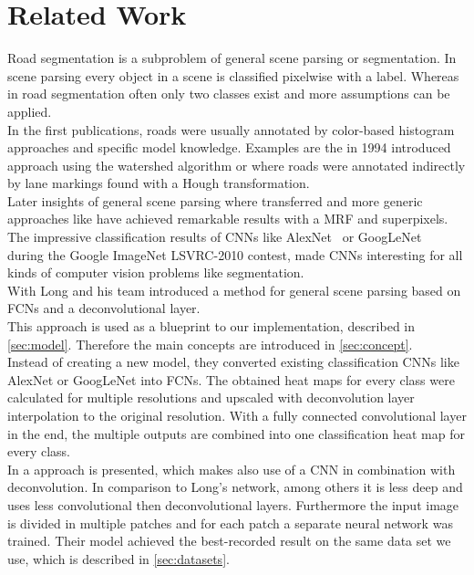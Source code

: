 
\section{Related Work}\label{sec:related-work}
Road segmentation is a subproblem of general scene parsing or segmentation. In
scene parsing every object in a scene is classified pixelwise with a label.
Whereas in road segmentation often only two classes exist and more assumptions
can be applied.\\
In the first publications, roads were usually annotated by color-based
histogram approaches and specific model knowledge. Examples are the in 1994
introduced approach \cite{Beucher1990} using the watershed algorithm or
\cite{aly2008real} where roads were annotated indirectly by lane markings found
with a Hough transformation.\\
Later insights of general scene parsing where transferred and more generic
approaches like \cite{6182716} have achieved remarkable results with a
\gls{MRF} and superpixels.\\ The impressive classification results of
\glspl{CNN} like AlexNet~\cite{krizhevsky2012imagenet} or
GoogLeNet~\cite{SzegedyLJSRAEVR14} during the Google ImageNet LSVRC-2010
contest, made \glspl{CNN} interesting for all kinds of computer vision problems
like segmentation.\\
With \cite{long2014fully} Long and his team introduced a method for general
scene parsing based on \glspl{FCN} and a deconvolutional layer.\\
This approach is used as a blueprint to our implementation, described in
\cref{sec:model}. Therefore the main concepts are introduced in
\cref{sec:concept}.\\
Instead of creating a new model, they converted existing classification
\glspl{CNN} like AlexNet or GoogLeNet into \glspl{FCN}. The obtained heat maps for
every class were calculated for multiple resolutions and upscaled with
deconvolution layer interpolation to the original resolution. With a fully
connected convolutional layer in the end, the multiple outputs are combined
into one classification heat map for every class.\\

In \cite{mohan2014deep} a approach is presented, which makes also use of a
\gls{CNN} in combination with deconvolution. In comparison to Long's network,
among others it is less deep and uses less convolutional then deconvolutional
layers. Furthermore the input image is divided in multiple patches and for each
patch a separate neural network was trained. Their model achieved the
best-recorded result on the same data set we use, which is described in
\cref{sec:datasets}.


